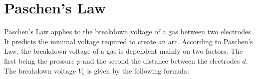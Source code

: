 \section{Paschen's Law}
Paschen's Law applies to the breakdown voltage of a gas between two electrodes. It predicts the minimal voltage required to create an arc. According to Paschen's Law, the breakdown voltage of a gas is dependent mainly on two factors. The first being the pressure $p$ and the second the distance between the electrodes $d$. The breakdown voltage $V_{b}$ is given by the following formula:

